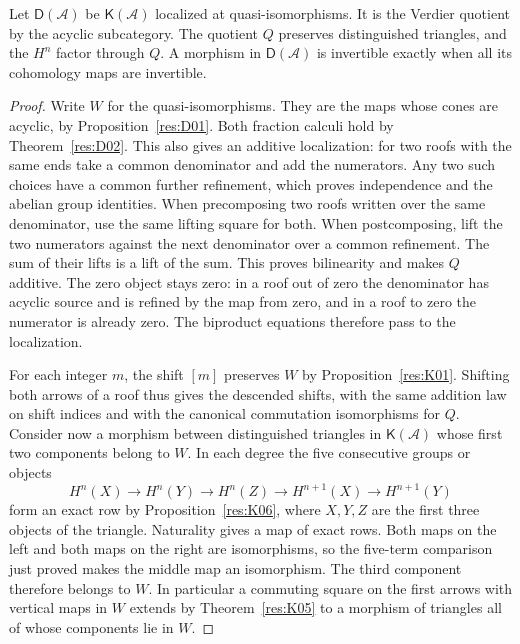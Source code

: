 \begin{theorem}\label{res:D03}
Let \(\mathsf D(\mathcal A)\) be \(\mathsf K(\mathcal A)\) localized at
quasi-isomorphisms. It is the Verdier quotient by the acyclic
subcategory. The quotient \(Q\) preserves distinguished triangles,
and the \(H^n\) factor through \(Q\). A morphism in \(\mathsf D(\mathcal A)\)
is invertible exactly when all its cohomology maps are invertible.
\end{theorem}
\begin{proof}
Write \(W\) for the quasi-isomorphisms. They are the maps whose cones
are acyclic, by Proposition~\ref{res:D01}. Both fraction calculi
hold by Theorem~\ref{res:D02}. This also gives an additive
localization: for two roofs with the same ends take a common
denominator and add the numerators. Any two such choices have a
common further refinement, which proves independence and the
abelian group identities. When precomposing two roofs written
over the same denominator, use the same lifting square for both.
When postcomposing, lift the two numerators against the next
denominator over a common refinement. The sum of their lifts
is a lift of the sum. This proves bilinearity and makes \(Q\)
additive. The zero object stays zero: in a roof out of zero the
denominator has acyclic source and is refined by the map from zero,
and in a roof to zero the numerator is already zero. The biproduct
equations therefore pass to the localization.

For each integer \(m\), the shift \([m]\) preserves \(W\) by
Proposition~\ref{res:K01}. Shifting both arrows of a roof thus
gives the descended shifts, with the same addition law on
shift indices and with the canonical commutation isomorphisms
for \(Q\). Consider now a morphism between distinguished triangles
in \(\mathsf K(\mathcal A)\) whose first two components belong to
\(W\). In each degree the five consecutive groups or objects
\[
 H^n(X)\longrightarrow H^n(Y)\longrightarrow H^n(Z)
       \longrightarrow H^{n+1}(X)\longrightarrow H^{n+1}(Y)
\]
form an exact row by Proposition~\ref{res:K06}, where \(X,Y,Z\)
are the first three objects of the triangle. Naturality gives a
map of exact rows. Both maps on the left and both maps on the
right are isomorphisms, so the five-term comparison just proved
makes the middle map an isomorphism. The third component therefore belongs to \(W\).
In particular a commuting square on the first arrows with vertical
maps in \(W\) extends by Theorem~\ref{res:K05} to a morphism of
triangles all of whose components lie in \(W\).


\end{proof}
